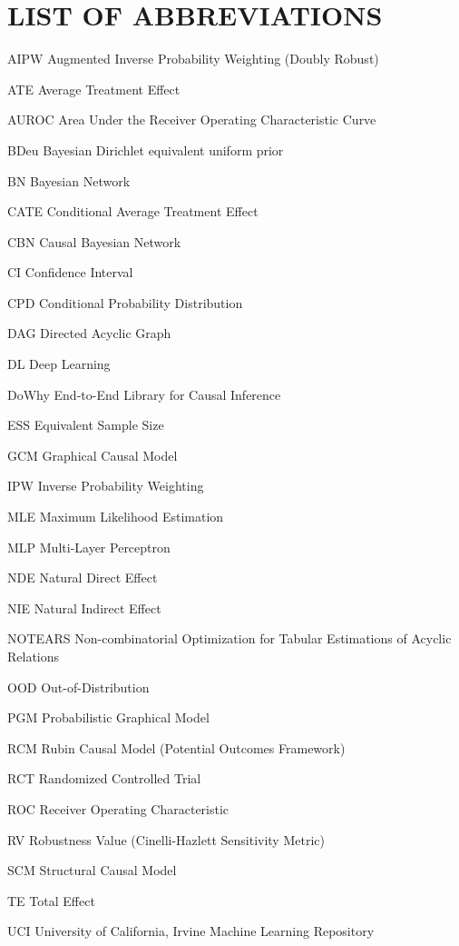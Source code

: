 \chapter*{LIST OF ABBREVIATIONS}

\begin{abbrv}
    \item[AIPW] Augmented Inverse Probability Weighting (Doubly Robust)
    \item[ATE] Average Treatment Effect
    \item[AUROC] Area Under the Receiver Operating Characteristic Curve
    \item[BDeu] Bayesian Dirichlet equivalent uniform prior
    \item[BN] Bayesian Network
    \item[CATE] Conditional Average Treatment Effect
    \item[CBN] Causal Bayesian Network
    \item[CI] Confidence Interval
    \item[CPD] Conditional Probability Distribution
    \item[DAG] Directed Acyclic Graph
    \item[DL] Deep Learning
    \item[DoWhy] End-to-End Library for Causal Inference
    \item[ESS] Equivalent Sample Size
    \item[GCM] Graphical Causal Model
    \item[IPW] Inverse Probability Weighting
    \item[MLE] Maximum Likelihood Estimation
    \item[MLP] Multi-Layer Perceptron
    \item[NDE] Natural Direct Effect
    \item[NIE] Natural Indirect Effect
    \item[NOTEARS] Non-combinatorial Optimization for Tabular Estimations of Acyclic Relations
    \item[OOD] Out-of-Distribution
    \item[PGM] Probabilistic Graphical Model
    \item[RCM] Rubin Causal Model (Potential Outcomes Framework)
    \item[RCT] Randomized Controlled Trial
    \item[ROC] Receiver Operating Characteristic
    \item[RV] Robustness Value (Cinelli-Hazlett Sensitivity Metric)
    \item[SCM] Structural Causal Model
    \item[TE] Total Effect
    \item[UCI] University of California, Irvine Machine Learning Repository
\end{abbrv}
